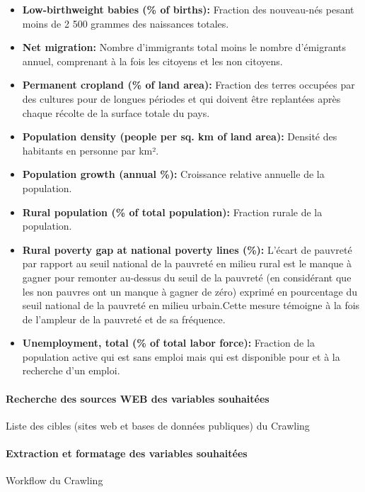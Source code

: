 \begin{itemize}
		\item \textbf{ Low-birthweight babies (\% of births):} Fraction des nouveau-nés pesant moins de 2 500 grammes des naissances totales.
		\item \textbf{ Net migration:} Nombre d'immigrants total moins le nombre d'émigrants annuel, comprenant à la fois les citoyens et les non citoyens.
		\item \textbf{ Permanent cropland (\% of land area):} Fraction des terres occupées par des cultures pour de longues périodes et qui doivent être replantées après chaque récolte de la surface totale du pays.
		\item \textbf{ Population density (people per sq. km of land area):} Densité des habitants en personne par km².
		\item \textbf{ Population growth (annual \%):} Croissance relative annuelle de la population.
		\item \textbf{ Rural population (\% of total population):} Fraction rurale de la population.
		\item \textbf{ Rural poverty gap at national poverty lines (\%):} L'écart de pauvreté par rapport au seuil national de la pauvreté en milieu rural est le manque à gagner pour remonter au-dessus du seuil de la pauvreté (en considérant que les non pauvres ont un manque à gagner de zéro) exprimé en pourcentage du seuil national de la pauvreté en milieu urbain.Cette mesure témoigne à la fois de l'ampleur de la pauvreté et de sa fréquence.
		\item \textbf{ Unemployment, total (\% of total labor force):} Fraction de la population active qui est sans emploi mais qui est disponible pour et à la recherche d'un emploi.
		\end{itemize}
	\paragraph{Recherche des sources WEB des variables souhaitées \newline}
	\par
	\begin{Huge}{ Liste des cibles (sites web et bases de données publiques) du Crawling }
		\end{Huge}
	\paragraph{Extraction et formatage des variables souhaitées \newline}\label{crawl}
	\par
	 \begin{Huge}{ Workflow du  Crawling }
	 		\end{Huge}
